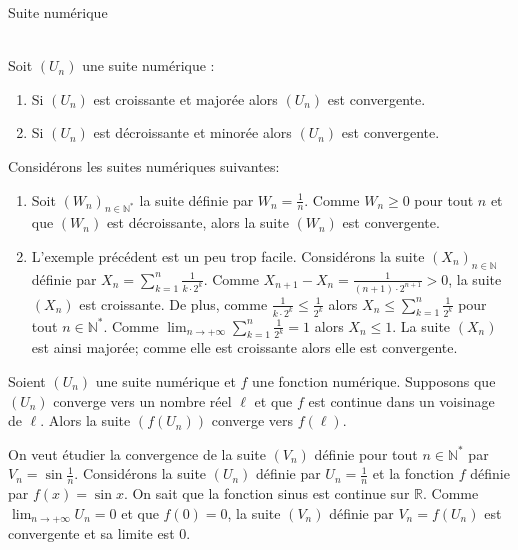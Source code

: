 \begin{chapter}{Suite num\'erique}
\begin{thm}[admis] ~\\
Soit $(U_n)$ une suite num\'erique :
\begin{enumerate}
\item Si $(U_n)$ est croissante et major\'ee alors $(U_n)$ est convergente.
\item Si $(U_n)$ est d\'ecroissante et minor\'ee alors $(U_n)$ est convergente.
\end{enumerate}
\end{thm}
%
\begin{ex}
Consid\'erons les suites num\'eriques suivantes:
\begin{enumerate}
\item Soit $(W_n)_{n \in \mathbb{N}^*}$ la suite d\'efinie par $W_n = \frac{1}{n}$. 
      Comme $W_n \geq 0$ pour tout $n$ et que $(W_n)$ est d\'ecroissante, alors la suite $(W_n)$ est convergente.
\item L'exemple pr\'ec\'edent est un peu trop facile. Consid\'erons la suite $(X_n)_{n \in \mathbb{N}}$ d\'efinie par 
      $X_n = \sum_{k = 1}^n \frac{1}{k \cdot 2^k}$.
      Comme $X_{n+1} - X_n = \frac{1}{(n+1) \cdot 2^{n+1}} > 0$, la suite $(X_n)$ est croissante.
      De plus, comme $\frac{1}{k \cdot 2^k} \leq \frac{1}{2^k}$ alors 
      $X_n \leq \sum_{k = 1}^n \frac{1}{2^k}$ pour tout $n \in \mathbb{N}^*$.
      Comme $\lim_{n \rightarrow + \infty} \sum_{k = 1}^n \frac{1}{2^k} = 1$ alors $X_n \leq 1$.
      La suite $(X_n)$ est ainsi major\'ee; comme elle est croissante alors elle est convergente.
\end{enumerate}
\end{ex}
%
\begin{thm}
Soient $(U_n)$ une suite num\'erique et $f$ une fonction num\'erique.
Supposons que $(U_n)$ converge vers un nombre r\'eel $\ell$ et que $f$ est continue dans un voisinage de $\ell$.
Alors la suite $(f(U_n))$ converge vers $f(\ell)$.
\end{thm}
\begin{ex}
On veut \'etudier la convergence de la suite $(V_n)$ d\'efinie pour tout $n \in \mathbb{N}^*$ par $V_n = \sin \frac{1}{n}$.
Consid\'erons la suite $(U_n)$ d\'efinie par $U_n = \frac{1}{n}$ et la fonction $f$ d\'efinie par $f(x) = \sin x$.
On sait que la fonction sinus est continue sur $\mathbb{R}$.
Comme $\lim_{n \rightarrow + \infty} U_n = 0$ et que $f(0) = 0$, 
la suite $(V_n)$ d\'efinie par $V_n = f(U_n)$ est convergente et sa limite est $0$.
\end{ex}
%

\end{chapter}

